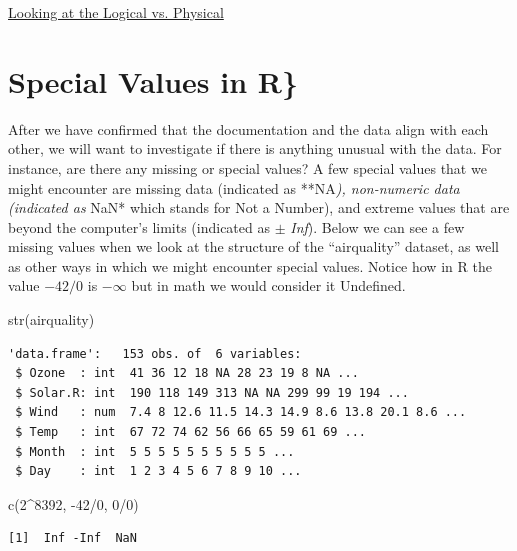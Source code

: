 \documentclass[
  letterpaper,
  DIV=11,
  numbers=noendperiod]{scrreprt}
\newenvironment{Shaded}{\begin{snugshade}}{\end{snugshade}}
\newcommand{\DecValTok}[1]{\textcolor[rgb]{0.68,0.00,0.00}{#1}}
\newcommand{\FunctionTok}[1]{\textcolor[rgb]{0.28,0.35,0.67}{#1}}
\newcommand{\NormalTok}[1]{\textcolor[rgb]{0.00,0.23,0.31}{#1}}
\newcommand{\SpecialCharTok}[1]{\textcolor[rgb]{0.37,0.37,0.37}{#1}}
\begin{document}
\begin{watch}{}{}
    \href{https://youtu.be/e70L-Zy__0I}{Looking at the Logical vs. Physical}
\end{watch}

\section{Special Values in R\}}\label{special-values-in-r}

After we have confirmed that the documentation and the data align with
each other, we will want to investigate if there is anything unusual
with the data. For instance, are there any missing or special values? A
few special values that we might encounter are missing data (indicated
as **NA\emph{), non-numeric data (indicated as }NaN* which stands for
Not a Number), and extreme values that are beyond the computer's limits
(indicated as \(\pm\) \emph{Inf}). Below we can see a few missing values
when we look at the structure of the ``airquality'' dataset, as well as
other ways in which we might encounter special values. Notice how in R
the value \(-42/0\) is \(-\infty\) but in math we would consider it
Undefined.

\begin{Shaded}
\begin{Highlighting}[]
\FunctionTok{str}\NormalTok{(airquality)}
\end{Highlighting}
\end{Shaded}

\begin{verbatim}
'data.frame':   153 obs. of  6 variables:
 $ Ozone  : int  41 36 12 18 NA 28 23 19 8 NA ...
 $ Solar.R: int  190 118 149 313 NA NA 299 99 19 194 ...
 $ Wind   : num  7.4 8 12.6 11.5 14.3 14.9 8.6 13.8 20.1 8.6 ...
 $ Temp   : int  67 72 74 62 56 66 65 59 61 69 ...
 $ Month  : int  5 5 5 5 5 5 5 5 5 5 ...
 $ Day    : int  1 2 3 4 5 6 7 8 9 10 ...
\end{verbatim}

\begin{Shaded}
\begin{Highlighting}[]
\FunctionTok{c}\NormalTok{(}\DecValTok{2}\SpecialCharTok{\^{}}\DecValTok{8392}\NormalTok{, }\SpecialCharTok{{-}}\DecValTok{42}\SpecialCharTok{/}\DecValTok{0}\NormalTok{, }\DecValTok{0}\SpecialCharTok{/}\DecValTok{0}\NormalTok{)}
\end{Highlighting}
\end{Shaded}

\begin{verbatim}
[1]  Inf -Inf  NaN
\end{verbatim}
\end{document}
